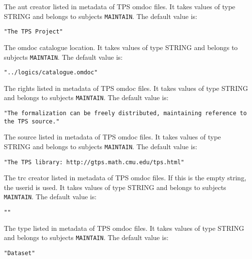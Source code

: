 \begin{description} 
\item[OMDOC-AUT-CREATOR]  
The aut creator listed in metadata of TPS omdoc files.
It takes values of type STRING and belongs to subjects \texttt{MAINTAIN}.  The default value is: \begin{lstlisting}
"The TPS Project"
\end{lstlisting}

\item[OMDOC-CATALOGUE]  
The omdoc catalogue location.
It takes values of type STRING and belongs to subjects \texttt{MAINTAIN}.  The default value is: \begin{lstlisting}
"../logics/catalogue.omdoc"
\end{lstlisting}

\item[OMDOC-RIGHTS]  
The rights listed in metadata of TPS omdoc files.
It takes values of type STRING and belongs to subjects \texttt{MAINTAIN}.  The default value is: \begin{lstlisting}
"The formalization can be freely distributed, maintaining reference to the TPS source."
\end{lstlisting}

\item[OMDOC-SOURCE]  
The source listed in metadata of TPS omdoc files.
It takes values of type STRING and belongs to subjects \texttt{MAINTAIN}.  The default value is: \begin{lstlisting}
"The TPS library: http://gtps.math.cmu.edu/tps.html"
\end{lstlisting}

\item[OMDOC-TRC-CREATOR]  
The trc creator listed in metadata of TPS omdoc files.
If this is the empty string, the userid is used.
It takes values of type STRING and belongs to subjects \texttt{MAINTAIN}.  The default value is: \begin{lstlisting}
""
\end{lstlisting}

\item[OMDOC-TYPE]  
The type listed in metadata of TPS omdoc files.
It takes values of type STRING and belongs to subjects \texttt{MAINTAIN}.  The default value is: \begin{lstlisting}
"Dataset"
\end{lstlisting}

\item
\end{description}

